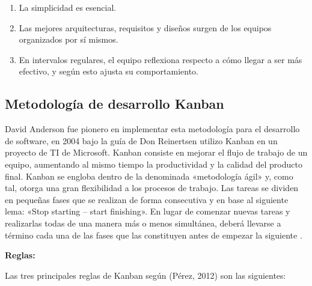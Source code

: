 \documentclass[../Main.tex]{subfiles}
\begin{document}
\begin{enumerate}
    \item La simplicidad es esencial. \par
    
    \item Las mejores arquitecturas, requisitos y diseños surgen de los equipos organizados por sí mismos. \par
    
    \item En intervalos regulares, el equipo reflexiona respecto a cómo llegar a ser más efectivo, y según esto ajusta su comportamiento.
\end{enumerate}\par

\subsection{Metodología de desarrollo Kanban}
\begin{justify}
David Anderson fue pionero en implementar esta metodología para el desarrollo de software, en 2004 bajo la guía de Don Reinertsen utilizo Kanban en un proyecto de TI de Microsoft. Kanban consiste en mejorar el flujo de trabajo de un equipo, aumentando al mismo tiempo la productividad y la calidad del producto final. Kanban se engloba dentro de la denominada «metodología ágil» y, como tal, otorga una gran flexibilidad a los procesos de trabajo. Las tareas se dividen en pequeñas fases que se realizan de forma consecutiva y en base al siguiente lema: «Stop starting – start finishing». En lugar de comenzar nuevas tareas y realizarlas todas de una manera más o menos simultánea, deberá llevarse a término cada una de las fases que las constituyen antes de empezar la siguiente \cite{28}. 
\end{justify}\par

\begin{justify}
\textbf{Reglas:}
\end{justify}\par
\begin{justify}
Las tres principales reglas de Kanban según (Pérez, 2012) \cite{29} son las siguientes: 
\end{justify}\par
\end{document}
